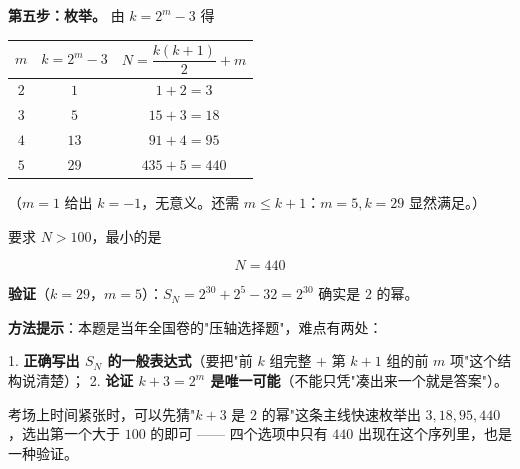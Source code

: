 \begin{answer}
\textbf{第五步：枚举。} 由 $k=2^{m}-3$ 得

\begin{center}
\begin{tabular}{ccc}
\toprule
$m$ & $k=2^{m}-3$ & $N=\dfrac{k(k+1)}2+m$ \\
\midrule
$2$ & $1$ & $1+2=3$ \\
$3$ & $5$ & $15+3=18$ \\
$4$ & $13$ & $91+4=95$ \\
$5$ & $29$ & $435+5=440$ \\
\bottomrule
\end{tabular}
\end{center}

（$m=1$ 给出 $k=-1$，无意义。还需 $m\le k+1$：$m=5,k=29$ 显然满足。）

要求 $N>100$，最小的是

\nopagebreak[4]
\[N=440\]

\textbf{验证}（$k=29$，$m=5$）：$S_N=2^{30}+2^{5}-32=2^{30}$  确实是 $2$ 的幂。

\begin{gktip}
\textbf{方法提示}：本题是当年全国卷的"压轴选择题"，难点有两处：

1. \textbf{正确写出 $S_N$ 的一般表达式}（要把"前 $k$ 组完整 + 第 $k+1$ 组的前 $m$ 项"这个结构说清楚）；
2. \textbf{论证 $k+3=2^{m}$ 是唯一可能}（不能只凭"凑出来一个就是答案"）。

考场上时间紧张时，可以先猜"$k+3$ 是 $2$ 的幂"这条主线快速枚举出 $3,18,95,440$，选出第一个大于 $100$ 的即可 —— 四个选项中只有 $440$ 出现在这个序列里，也是一种验证。
\end{gktip}


\par\medskip

\end{answer}

